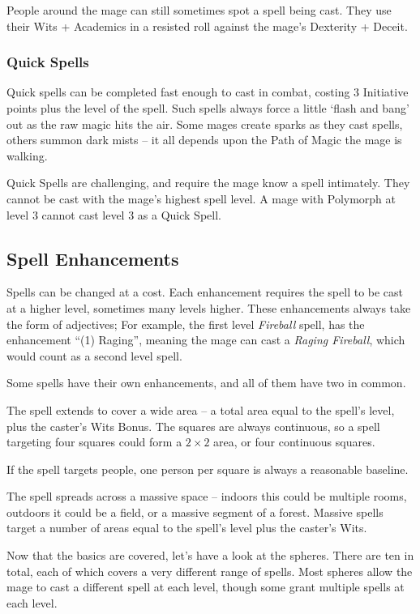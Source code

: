 \begin{multicols}{2}
People around the mage can still sometimes spot a spell being cast. They use their Wits + Academics in a resisted roll against the mage's Dexterity + Deceit.

\subsubsection{Quick Spells}

Quick spells can be completed fast enough to cast in combat, costing 3 Initiative points plus the level of the spell.
Such spells always force a little `flash and bang' out as the raw magic hits the air.
Some mages create sparks as they cast spells, others summon dark mists -- it all depends upon the Path of Magic the mage is walking.

Quick Spells are challenging, and require the mage know a spell intimately.  They cannot be cast with the mage's highest spell level.  A mage with Polymorph at level 3 cannot cast level 3 as a Quick Spell.

\subsection{Spell Enhancements}

Spells can be changed at a cost.
Each enhancement requires the spell to be cast at a higher level, sometimes many levels higher.
These enhancements always take the form of adjectives;
For example, the first level \textit{Fireball} spell, has the enhancement ``(1) Raging'', meaning the mage can cast a \textit{Raging Fireball}, which would count as a second level spell.

Some spells have their own enhancements, and all of them have two in common.

The spell extends to cover a wide area -- a total area equal to the spell's level, plus the caster's Wits Bonus.
The squares are always continuous, so a spell targeting four squares could form a $2\times 2$ area, or four continuous squares.

If the spell targets people, one person per square is always a reasonable baseline.


The spell spreads across a massive space -- indoors this could be multiple rooms, outdoors it could be a field, or a massive segment of a forest.
Massive spells target a number of areas equal to the spell's level plus the caster's Wits.

\vspace{.3in} 

\noindent Now that the basics are covered, let's have a look at the \glspl{sphere}. There are ten in total, each of which covers a very different range of spells. Most \glspl{sphere} allow the mage to cast a different spell at each level, though some grant multiple spells at each level.

\end{multicols}

